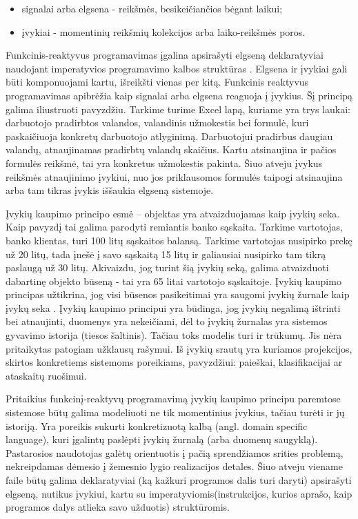 \documentclass[12pt, a4paper, lithuanian]{article}
\begin{document}
\begin{itemize}
        \item signalai arba elgsena - reikšmės, besikeičiančios bėgant laikui;
        \item įvykiai - momentinių reikšmių kolekcijos arba laiko-reikšmės poros.
\end{itemize}

    Funkcinis-reaktyvus programavimas įgalina apsirašyti elgseną deklaratyviai naudojant imperatyvios programavimo kalbos struktūras \cite[p.1]{ElliottHudak97:Fran}. Elgsena ir įvykiai gali būti komponuojami kartu, išreikšti vienas per kitą. Funkcinis reaktyvus programavimas apibrėžia kaip signalai arba elgsena reaguoja į įvykius. \cite[p. 1]{Survey} Šį principą galima iliustruoti pavyzdžiu. Tarkime turime Excel lapą, kuriame yra trys laukai: darbuotojo pradirbtos valandos, valandinis užmokestis bei formulė, kuri paskaičiuoja konkretų darbuotojo atlyginimą. Darbuotojui pradirbus daugiau valandų, atnaujinamas pradirbtų valandų skaičius. Kartu atsinaujina ir pačios formulės reikšmė, tai yra konkretus užmokestis pakinta. Šiuo atveju įvykus reikšmės atnaujinimo įvykiui, nuo jos priklausomos formulės taipogi atsinaujina arba tam tikras įvykis iššaukia elgseną sistemoje.

    Įvykių kaupimo principo esmė – objektas yra atvaizduojamas kaip įvykių seka. Kaip pavyzdį tai galima parodyti remiantis banko sąskaita. Tarkime vartotojas, banko klientas, turi 100 litų sąskaitos balansą. Tarkime vartotojas nusipirko prekę už 20 litų, tada įnešė į savo sąskaitą 15 litų ir galiausiai nusipirko tam tikrą paslaugą už 30 litų. Akivaizdu, jog turint šią įvykių seką, galima atvaizduoti dabartinę objekto būseną - tai yra 65 litai vartotojo sąskaitoje. Įvykių kaupimo principas užtikrina, jog visi būsenos pasikeitimai yra saugomi įvykių žurnale kaip įvykų seka \cite{DDD:Vernon}. Įvykių kaupimo principui yra būdinga, jog įvykių negalimą ištrinti bei atnaujinti, duomenys yra nekeičiami, dėl to įvykių žurnalas yra sistemos gyvavimo istorija (tiesos šaltinis). Tačiau toks modelis turi ir trūkumų. Jis nėra pritaikytas patogiam užklausų rašymui. Iš įvykių srautų yra kuriamos projekcijos, skirtos konkretiems sistemoms poreikiams, pavyzdžiui: paieškai, klasifikacijai ar ataskaitų ruošimui.

    Pritaikius funkcinį-reaktyvų programavimą įvykių kaupimo principu paremtose sistemose būtų galima modeliuoti ne tik momentinius įvykius, tačiau turėti ir jų istoriją. Yra poreikis sukurti konkretizuotą kalbą (angl. domain specific language), kuri įgalintų paslėpti įvykių žurnalą (arba duomenų saugyklą). Pastarosios naudotojas galėtų orientuotis į pačią sprendžiamos srities problemą, nekreipdamas dėmesio į žemesnio lygio realizacijos detales. Šiuo atveju viename faile būtų galima deklaratyviai (ką kažkuri programos dalis turi daryti) apsirašyti elgseną, nutikus įvykiui, kartu su imperatyviomis(instrukcijos, kurios aprašo, kaip programos dalys atlieka savo užduotis) struktūromis.
\end{document}
